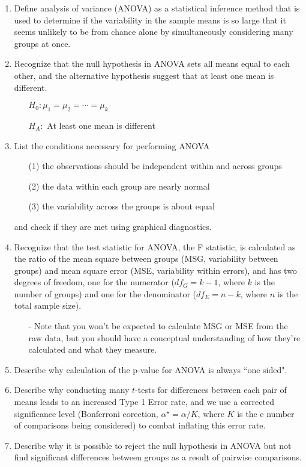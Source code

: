 \documentclass[11pt]{article}
\begin{document}
\begin{enumerate}[resume]
\renewcommand\labelenumi{\textcolor{light}{\textbf{LO \theenumi.}}}

\item Define analysis of variance (ANOVA) as a statistical inference method that is used to determine if the variability in the sample means is so large that it seems unlikely to be from chance alone by simultaneously considering many groups at once.

\item Recognize that the null hypothesis in ANOVA sets all means equal to each other, and the alternative hypothesis suggest that at least one mean is different.
\begin{itemize}
\item[] $H_0: \mu_1 = \mu_2 = \cdots = \mu_k$
\item[] $H_A:$ At least one mean is different
\end{itemize} 

\item List the conditions necessary for performing ANOVA
\begin{enumerate}
\item[(1)] the observations should be independent within and across groups
\item[(2)] the data within each group are nearly normal
\item[(3)] the variability across the groups is about equal
\end{enumerate}
and check if they are met using graphical diagnostics.

\item Recognize that the test statistic for ANOVA, the F statistic, is calculated as the ratio of the mean square between groups (MSG, variability between groups) and mean square error (MSE, variability within errors), and has two degrees of freedom, one for the numerator ($df_{G} = k - 1$, where $k$ is the number of groups) and one for the denominator ($df_{E} = n - k$, where $n$ is the total sample size).
\begin{itemize}
\item[-] Note that you won't be expected to calculate MSG or MSE from the raw data, but you should have a conceptual understanding of how they're calculated and what they measure.
\end{itemize} 

\item Describe why calculation of the p-value for ANOVA is always ``one sided".

\item Describe why conducting many $t$-tests for differences between each pair of means leads to an increased Type 1 Error rate, and we use a corrected significance level (Bonferroni corection, $\alpha^\star = \alpha / K$, where $K$ is the e number of comparisons being considered) to combat inflating this error rate.

\item Describe why it is possible to reject the null hypothesis in ANOVA but not find significant differences between groups as a result of pairwise comparisons.

\end{enumerate}
\end{document}

